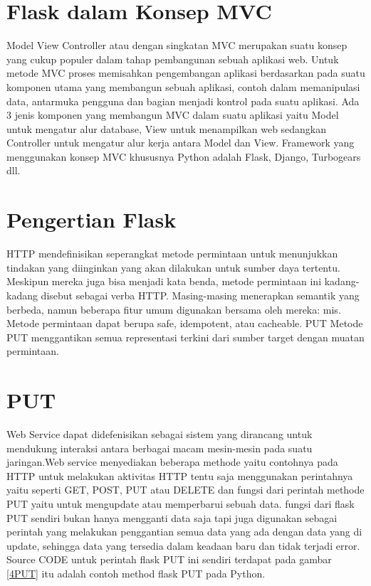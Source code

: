 \section{Flask dalam Konsep MVC}
Model View Controller atau dengan singkatan MVC merupakan suatu konsep yang cukup populer dalam tahap pembangunan sebuah aplikasi web. 
Untuk metode MVC proses memisahkan pengembangan aplikasi berdasarkan pada suatu komponen utama yang membangun sebuah aplikasi, 
contoh dalam memanipulasi data, antarmuka pengguna dan bagian menjadi kontrol pada suatu aplikasi. 
Ada 3 jenis komponen yang membangun MVC dalam suatu aplikasi yaitu Model untuk mengatur alur database, View untuk menampilkan web sedangkan Controller untuk mengatur alur kerja antara Model dan View. 
Framework yang menggunakan konsep MVC khususnya Python adalah Flask, Django, Turbogears dll.

\section{Pengertian Flask}
HTTP mendefinisikan seperangkat metode permintaan untuk menunjukkan tindakan yang diinginkan yang akan dilakukan untuk sumber daya tertentu. Meskipun mereka juga bisa menjadi kata benda, metode permintaan ini kadang-kadang disebut sebagai verba HTTP. Masing-masing menerapkan semantik yang berbeda, namun beberapa fitur umum digunakan bersama oleh mereka: mis. Metode permintaan dapat berupa safe, idempotent, atau cacheable.
PUT
Metode PUT menggantikan semua representasi terkini dari sumber target dengan muatan permintaan.

\section{PUT}
Web Service dapat didefenisikan sebagai sistem yang dirancang untuk mendukung interaksi antara berbagai macam mesin-mesin pada suatu jaringan.Web service menyediakan beberapa methode yaitu contohnya pada  HTTP untuk melakukan aktivitas HTTP tentu saja menggunakan perintahnya yaitu seperti  GET, POST, PUT atau DELETE dan fungsi dari perintah methode PUT yaitu untuk mengupdate atau memperbarui sebuah data.
fungsi dari flask PUT sendiri bukan hanya mengganti data saja tapi
juga digunakan sebagai perintah yang melakukan
penggantian semua data yang ada dengan data yang di update, sehingga
data yang tersedia dalam keadaan baru dan tidak terjadi error.
Source CODE untuk perintah flask PUT ini sendiri terdapat pada gambar \ref{4PUT} 
itu adalah contoh method flask PUT pada Python.

